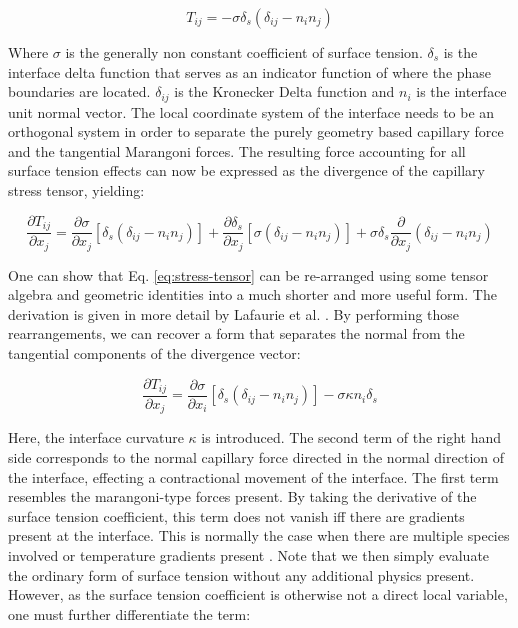 \documentclass[conference,final]{IEEEtran}
\begin{document}
\begin{equation}
    T_{ij} = - \sigma \delta_s (\delta_{ij} - n_i n_j)
\end{equation}

Where $\sigma$ is the generally non constant coefficient of surface tension. $\delta_s$ is the interface delta function that serves as an indicator function of where the phase boundaries are located. $\delta_{ij}$ is the Kronecker Delta function and $n_i$ is the interface unit normal vector. The local coordinate system of the interface needs to be an orthogonal system in order to separate the purely geometry based capillary force and the tangential Marangoni forces.
The resulting force accounting for all surface tension effects can now be expressed as the divergence of the capillary stress tensor, yielding:

\begin{equation}
    \frac{\partial T_{ij}}{\partial x_j} = \frac{\partial \sigma}{\partial x_j} [\delta_s(\delta_{ij} - n_i n_j)] + \frac{\partial \delta_s}{\partial x_j} [\sigma (\delta_{ij} - n_i n_j)] + \sigma \delta_s \frac{\partial}{\partial x_j} (\delta_{ij} - n_i n_j) \label{eq:stress-tensor}
\end{equation}

One can show that Eq. \ref{eq:stress-tensor} can be re-arranged using some tensor algebra and geometric identities into a much shorter and more useful form. The derivation is given in more detail by Lafaurie et al. \cite{lafaurieModellingMergingFragmentation1994}. By performing those rearrangements, we can recover a form that separates the normal from the tangential components of the divergence vector:

\begin{equation}
    \frac{\partial T_{ij}}{\partial x_j} = \frac{\partial \sigma}{\partial x_i} [\delta_s(\delta_{ij} - n_i n_j)] - \sigma \kappa n_i \delta_s
\end{equation}

Here, the interface curvature $\kappa$ is introduced. The second term of the right hand side corresponds to the normal capillary force directed in the normal direction of the interface, effecting a contractional movement of the interface. The first term resembles the marangoni-type forces present. By taking the derivative of the surface tension coefficient, this term does not vanish iff there are gradients present at the interface. This is normally the case when there are multiple species involved or temperature gradients present \cite{j.straubThermokapillareGrenzflachenkonvektionGasblasen1990}. Note that we then simply evaluate the ordinary form of surface tension without any additional physics present. However, as the surface tension coefficient is otherwise not a direct local variable, one must further differentiate the term:
\end{document}
